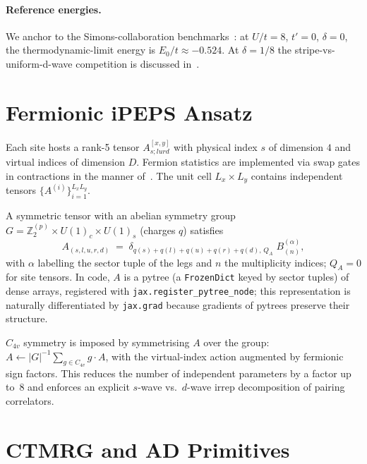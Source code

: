 \documentclass[aps,prb,reprint,amsmath,amssymb,floatfix]{revtex4-2}
\newcommand{\Z}{\mathbb{Z}}
\begin{document}
\paragraph{Reference energies.} We anchor to the Simons-collaboration benchmarks~\cite{LeBlanc2015,Qin2020}: at $U/t=8$, $t'=0$, $\delta=0$, the thermodynamic-limit energy is $E_0/t \approx -0.524$. At $\delta=1/8$ the stripe-vs-uniform-d-wave competition is discussed in~\cite{Ponsioen2019,Corboz2014}.

\section{Fermionic iPEPS Ansatz}
\label{sec:ansatz}

Each site hosts a rank-5 tensor $A^{[x,y]}_{s;lurd}$ with physical index $s$ of dimension $4$ and virtual indices of dimension $D$. Fermion statistics are implemented via swap gates in contractions in the manner of~\cite{Corboz2010}. The unit cell $L_x\!\times\! L_y$ contains independent tensors $\{A^{(i)}\}_{i=1}^{L_x L_y}$.

A symmetric tensor with an abelian symmetry group $G=\Z_2^{(p)}\!\times\! U(1)_c\!\times\! U(1)_s$ (charges $q$) satisfies
\begin{equation}
A_{(s,l,u,r,d)} \;=\; \delta_{q(s)+q(l)+q(u)+q(r)+q(d),\,Q_A}\;
B^{(\alpha)}_{(n)},
\end{equation}
with $\alpha$ labelling the sector tuple of the legs and $n$ the multiplicity indices; $Q_A=0$ for site tensors. In code, $A$ is a pytree (a \texttt{FrozenDict} keyed by sector tuples) of dense arrays, registered with \texttt{jax.register\_pytree\_node}; this representation is naturally differentiated by \texttt{jax.grad} because gradients of pytrees preserve their structure.

$C_{4v}$ symmetry is imposed by symmetrising $A$ over the group: $A \leftarrow |G|^{-1}\sum_{g\in C_{4v}} g\cdot A$, with the virtual-index action augmented by fermionic sign factors. This reduces the number of independent parameters by a factor up to~8 and enforces an explicit $s$-wave vs.\ $d$-wave irrep decomposition of pairing correlators.

\section{CTMRG and AD Primitives}
\label{sec:ad}
\end{document}
